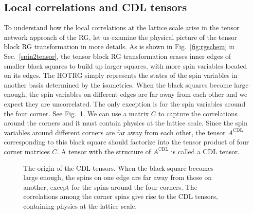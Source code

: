 \documentclass[aps,prb,reprint,superscriptaddress]{revtex4-2}
\begin{document}
\subsection{Local correlations and CDL tensors\label{CDLten}} To
understand how the local correlations at the lattice scale arise in the
tensor network approach of the RG, let us examine the physical picture
of the tensor block RG transformation in more details. As is shown in
Fig.~\ref{fig:rgschem} in Sec.~\ref{spin2tensor}, the tensor block RG
transformation erases inner edges of smaller black squares to build up
larger squares, with more spin variables located on its edges. The HOTRG
simply represents the states of the spin variables in another basis
determined by the isometries. When the black squares become large
enough, the spin variables on different edges are far away from each
other and we expect they are uncorrelated. The only exception is for the
spin variables around the four corner. See Fig.~\ref{fig:ariseCDL}. We
can use a matrix $C$ to capture the correlations around the corners and
it must contain physics at the lattice scale. Since the spin variables
around different corners are far away from each other, the tensor
$A^{\text{CDL}}$ corresponding to this black square should factorize
into the tensor product of four corner matrices $C$. A tensor with the
structure of $A^{\text{CDL}}$ is called a CDL tensor.
%
\begin{figure}[h]
     \caption{\label{fig:ariseCDL}The origin of the
        CDL tensors. When the black square becomes large enough, the
        spins on one edge are far away from those on another, except for
        the spins around the four corners. The correlations among the
corner spins give rise to the CDL tensors, containing physics at the
lattice scale.} \end{figure}
%
\end{document}
